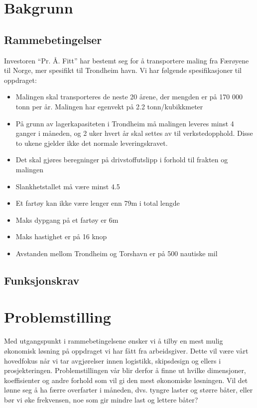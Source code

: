 \documentclass[norsk]{article}
\begin{document}
\section{Bakgrunn}
	\subsection{Rammebetingelser} 

Investoren “Pr. Å. Fitt” har bestemt seg for å transportere maling fra Færøyene til Norge, mer spesifikt til Trondheim havn. Vi har følgende spesifikasjoner til oppdraget:

\begin{itemize}
\item Malingen skal transporteres de neste 20 årene, der mengden er på 170 000 tonn per år. Malingen har egenvekt på 2.2 tonn/kubikkmeter
\item På grunn av lagerkapasiteten i Trondheim må malingen leveres minst 4 ganger i måneden, og 2 uker hvert år skal settes av til verkstedopphold. Disse to ukene gjelder ikke det normale leveringskravet.
\item Det skal gjøres beregninger på drivstoffutslipp i forhold til frakten og malingen
\item Slankhetstallet må være minst 4.5
\item Et fartøy kan ikke være lenger enn 79m i total lengde
\item Maks dypgang på et fartøy er 6m
\item Maks hastighet er på 16 knop
\item Avstanden mellom Trondheim og Torshavn er på 500 nautiske mil
\end{itemize}

	\subsection{Funksjonskrav}

\section{Problemstilling}
Med utgangspunkt i rammebetingelsene ønsker vi å tilby en mest mulig økonomisk løsning på oppdraget vi har fått fra arbeidsgiver. Dette vil være vårt hovedfokus når vi tar avgjørelser innen logistikk, skipsdesign og ellers i prosjekteringen. Problemstillingen vår blir derfor å finne ut hvilke dimensjoner, koeffisienter og andre forhold som vil gi den mest økonomiske løsningen. Vil det lønne seg å ha færre overfarter i måneden, dvs. tyngre laster og større båter, eller bør vi øke frekvensen, noe som gir mindre last og lettere båter?
\end{document}
